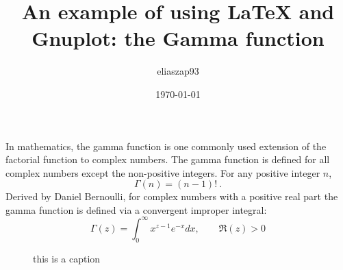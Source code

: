 \documentclass{article}
\title{An example of using \LaTeX{} and Gnuplot: the Gamma function}
\author{eliaszap93 }
\date{\today}
\begin{document}
\maketitle
\noindent In mathematics, the gamma function is one commonly used extension of the factorial function to complex numbers. 
 The gamma function is defined for all complex numbers except the non-positive integers. 
 For any positive integer $n$,
\begin{equation}
    \Gamma (n)=(n-1)!\ .
\end{equation}
Derived by Daniel Bernoulli, for complex numbers with a positive real part the gamma function is defined via a convergent improper integral:
\begin{equation}
    \Gamma (z)=\int _{0}^{\infty }x^{z-1}e^{-x} dx, \qquad \Re (z)>0
\end{equation}

\begin{figure}
    \centering
    
    \caption{this is a caption}
\end{figure}
\end{document}
